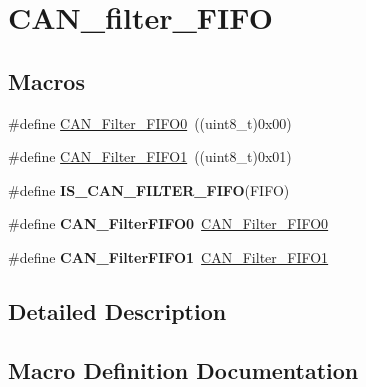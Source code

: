 \hypertarget{group___c_a_n__filter___f_i_f_o}{}\section{C\+A\+N\+\_\+filter\+\_\+\+F\+I\+F\+O}
\label{group___c_a_n__filter___f_i_f_o}
\subsection*{Macros}
\begin{DoxyCompactItemize}
\item 
\#define \hyperlink{group___c_a_n__filter___f_i_f_o_ga8249c27978ca94676530540b88a6be8f}{C\+A\+N\+\_\+\+Filter\+\_\+\+F\+I\+F\+O0}~((uint8\+\_\+t)0x00)
\item 
\#define \hyperlink{group___c_a_n__filter___f_i_f_o_gaab8478c89a607c4b8baf68efc730e316}{C\+A\+N\+\_\+\+Filter\+\_\+\+F\+I\+F\+O1}~((uint8\+\_\+t)0x01)
\item 
\#define {\bfseries I\+S\+\_\+\+C\+A\+N\+\_\+\+F\+I\+L\+T\+E\+R\+\_\+\+F\+I\+F\+O}(F\+I\+F\+O)
\item 
\hypertarget{group___c_a_n__filter___f_i_f_o_ga1b3d041dff9fed4dad75ed2a4a0e27e0}{}\#define {\bfseries C\+A\+N\+\_\+\+Filter\+F\+I\+F\+O0}~\hyperlink{group___c_a_n__filter___f_i_f_o_ga8249c27978ca94676530540b88a6be8f}{C\+A\+N\+\_\+\+Filter\+\_\+\+F\+I\+F\+O0}\label{group___c_a_n__filter___f_i_f_o_ga1b3d041dff9fed4dad75ed2a4a0e27e0}

\item 
\hypertarget{group___c_a_n__filter___f_i_f_o_gada8f9b3a9c88f36539aaeb457039e666}{}\#define {\bfseries C\+A\+N\+\_\+\+Filter\+F\+I\+F\+O1}~\hyperlink{group___c_a_n__filter___f_i_f_o_gaab8478c89a607c4b8baf68efc730e316}{C\+A\+N\+\_\+\+Filter\+\_\+\+F\+I\+F\+O1}\label{group___c_a_n__filter___f_i_f_o_gada8f9b3a9c88f36539aaeb457039e666}

\end{DoxyCompactItemize}


\subsection{Detailed Description}


\subsection{Macro Definition Documentation}
\hypertarget{group___c_a_n__filter___f_i_f_o_ga8249c27978ca94676530540b88a6be8f}{}
